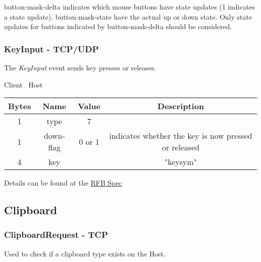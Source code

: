 button-mask-delta indicates which mouse buttons have state updates (1 indicates a state update). button-mask-state have the actual up or down state. Only state updates for buttons indicated by button-mask-delta should be considered.

\subsubsection{KeyInput - TCP/UDP}

The \emph{KeyInput} event sends key presses or releases.

\begin{center}
    Client \textrightarrow\ Host\\
    \begin{tabular}{|c|c|c|c|}
        \hline
        \textbf{Bytes} & \textbf{Name} & \textbf{Value} & \textbf{Description}                                 \\
        \hline
        1              & type          & 7              &                                                      \\
        \hline
        1              & down-flag     & 0 or 1         & indicates whether the key is now pressed or released \\
        \hline
        4              & key           &                & "keysym"                                             \\
        \hline
    \end{tabular}
\end{center}

Details can be found at the \href{https://github.com/rfbproto/rfbproto/blob/master/rfbproto.rst#keyevent}{RFB Spec}

\subsection{Clipboard}

\subsubsection{ClipboardRequest - TCP}

Used to check if a clipboard type exists on the Host.


